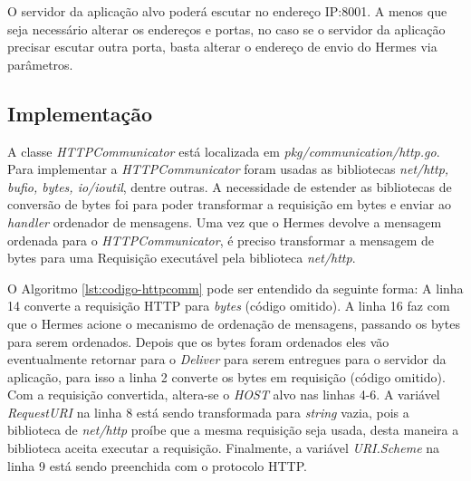 O servidor da aplicação alvo poderá escutar no endereço \gls{IP}:8001. A menos que seja necessário alterar os endereços e portas, no caso se o servidor da aplicação precisar escutar outra porta, basta alterar o endereço de envio do Hermes via parâmetros.

\subsection{Implementação}

A classe \textit{HTTPCommunicator} está localizada em \textit{pkg/communication/http.go}. Para implementar a \textit{HTTPCommunicator} foram usadas as bibliotecas \textit{net/http, bufio, bytes, io/ioutil}, dentre outras. A necessidade de estender as bibliotecas de conversão de bytes foi para poder transformar a requisição em bytes e enviar ao \textit{handler} ordenador de mensagens. Uma vez que o Hermes devolve a mensagem ordenada para o \textit{HTTPCommunicator}, é preciso transformar a mensagem de bytes para uma Requisição executável pela biblioteca \textit{net/http}.



O Algoritmo \ref{lst:codigo-httpcomm} pode ser entendido da seguinte forma: A linha 14 converte a requisição \gls{HTTP} para \textit{bytes} (código omitido). A linha 16 faz com que o Hermes acione o mecanismo de ordenação de mensagens, passando os bytes para serem ordenados. Depois que os bytes foram ordenados eles vão eventualmente retornar para o \textit{Deliver} para serem entregues para o servidor da aplicação, para isso a linha 2 converte os bytes em requisição (código omitido). Com a requisição convertida, altera-se o \textit{HOST} alvo nas linhas 4-6. A variável \textit{RequestURI} na linha 8 está sendo transformada para \textit{string} vazia, pois a biblioteca de \textit{net/http} proíbe que a mesma requisição seja usada, desta maneira a biblioteca aceita executar a requisição. Finalmente, a variável \textit{URI.Scheme} na linha 9 está sendo preenchida com o protocolo \gls{HTTP}.
